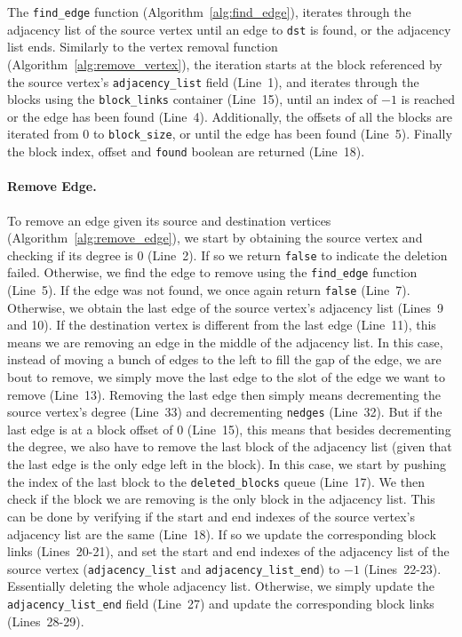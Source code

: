 The \texttt{find\_edge} function (Algorithm~\ref{alg:find_edge}), iterates through the adjacency list of the source vertex until an edge to \texttt{dst} is found, or the adjacency list ends. Similarly to the vertex removal function (Algorithm~\ref{alg:remove_vertex}), the iteration starts at the block referenced by the source vertex's \texttt{adjacency\_list} field (Line~1), and iterates through the blocks using the \texttt{block\_links} container (Line~15), until an index of $-1$ is reached or the edge has been found (Line~4). Additionally, the offsets of all the blocks are iterated from $0$ to \texttt{block\_size}, or until the edge has been found (Line~5). Finally the block index, offset and \texttt{found} boolean are returned (Line~18).



\paragraph{\textbf{Remove Edge}.}

 

To remove an edge given its source and destination vertices (Algorithm~\ref{alg:remove_edge}), we start by obtaining the source vertex and checking if its degree is $0$ (Line~2). If so we return \texttt{false} to indicate the deletion failed. Otherwise, we find the edge to remove using the \texttt{find\_edge} function (Line~5). If the edge was not found, we once again return \texttt{false} (Line~7). Otherwise, we obtain the last edge of the source vertex's adjacency list (Lines~9 and 10). If the destination vertex is different from the last edge (Line~11), this means we are removing an edge in the middle of the adjacency list. In this case, instead of moving a bunch of edges to the left to fill the gap of the edge, we are bout to remove, we simply move the last edge to the slot of the edge we want to remove (Line~13). Removing the last edge then simply means decrementing the source vertex's degree (Line~33) and decrementing \texttt{nedges} (Line~32). But if the last edge is at a block offset of $0$ (Line~15), this means that besides decrementing the degree, we also have to remove the last block of the adjacency list (given that the last edge is the only edge left in the block). In this case, we start by pushing the index of the last block to the \texttt{deleted\_blocks} queue (Line~17). We then check if the block we are removing is the only block in the adjacency list. This can be done by verifying if the start and end indexes of the source vertex's adjacency list are the same (Line~18). If so we update the corresponding block links (Lines~20-21), and set the start and end indexes of the adjacency list of the source vertex (\texttt{adjacency\_list} and \texttt{adjacency\_list\_end}) to $-1$ (Lines~22-23). Essentially deleting the whole adjacency list. Otherwise, we simply update the \texttt{adjacency\_list\_end} field (Line~27) and update the corresponding block links (Lines~28-29).

